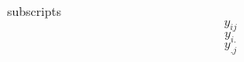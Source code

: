 \documentclass[12pt]{article}
\begin{document}
subscripts
$$y_{ij}$$
$$y_{i.}$$
$$y_{.j}$$
\end{document}
